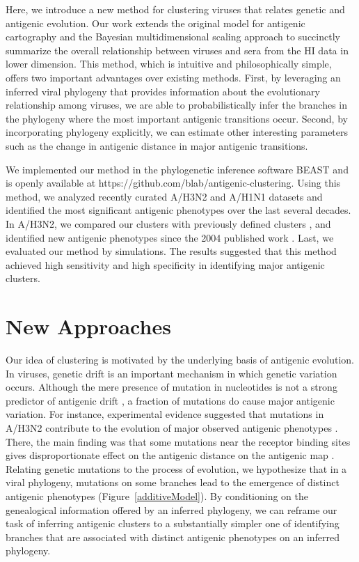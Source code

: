 \documentclass[11pt,oneside,letterpaper]{article}
\begin{document}
Here, we introduce a new method for clustering viruses that relates genetic and antigenic evolution. 
Our work extends the original model for antigenic cartography \cite{smith_mapping_2004} and the Bayesian multidimensional scaling approach \cite{bedford_integrating_2014} to succinctly summarize the overall relationship between viruses and sera from the HI data in lower dimension.
This method, which is intuitive and philosophically simple, offers two important advantages over existing methods. 
First, by leveraging an inferred viral phylogeny that provides information about the evolutionary relationship among viruses, we are able to probabilistically infer the branches in the phylogeny where the most important antigenic transitions occur. 
Second, by incorporating phylogeny explicitly, we can estimate other interesting parameters such as the change in antigenic distance in major antigenic transitions. 

We implemented our method in the phylogenetic inference software BEAST and is openly available at https://github.com/blab/antigenic-clustering.
Using this method, we analyzed recently curated A/H3N2 and A/H1N1 datasets and identified the most significant antigenic phenotypes over the last several decades. 
In A/H3N2, we compared our clusters with previously defined clusters \cite{smith_mapping_2004}, and identified new antigenic phenotypes since the 2004 published work \cite{smith_mapping_2004}. 
Last, we evaluated our method by simulations.
The results suggested that this method achieved high sensitivity and high specificity in identifying major antigenic clusters.



\newpage

\section*{New Approaches}

Our idea of clustering is motivated by the underlying basis of antigenic evolution.  
In viruses, genetic drift is an important mechanism in which genetic variation occurs. 
Although the mere presence of mutation in nucleotides is not a strong predictor of antigenic drift \cite{smith_mapping_2004}, a fraction of mutations do cause major antigenic variation. 
For instance, experimental evidence suggested that mutations in A/H3N2 contribute to the evolution of major observed antigenic phenotypes \cite{koel_substitutions_2013}.
There, the main finding was that some mutations near the receptor binding sites gives disproportionate effect on the antigenic distance on the antigenic map \cite{koel_substitutions_2013}. 
Relating genetic mutations to the process of evolution, we hypothesize that in a viral phylogeny, mutations on some branches lead to the emergence of distinct antigenic phenotypes (Figure~\ref{additiveModel}).  
By conditioning on the genealogical information offered by an inferred phylogeny, we can reframe our task of inferring antigenic clusters to a substantially simpler one of identifying branches that are associated with distinct antigenic phenotypes on an inferred phylogeny.
	
\end{document}
